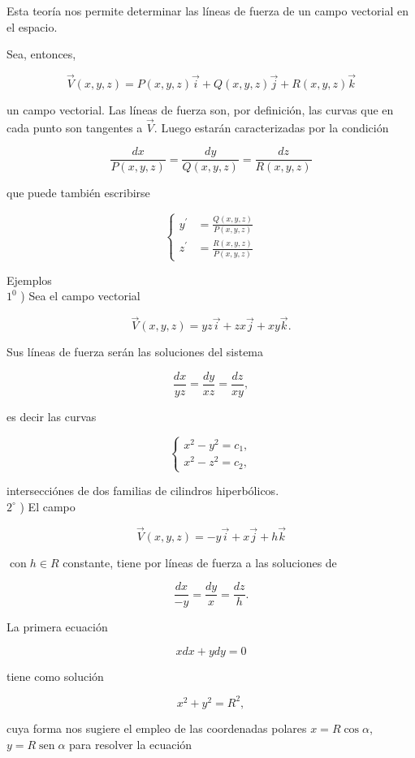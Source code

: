 \documentclass[10pt]{article}
\theoremstyle{plain}
\theoremstyle{definition}
\theoremstyle{remark}
\begin{document}
Esta teoría nos permite determinar las líneas de fuerza de un campo vectorial en el espacio.

Sea, entonces,

$$
\vec{V}(x, y, z)=P(x, y, z) \vec{i}+Q(x, y, z) \vec{j}+R(x, y, z) \vec{k}
$$

un campo vectorial. Las líneas de fuerza son, por definición, las curvas que en cada punto son tangentes a $\vec{V}$. Luego estarán caracterizadas por la condición

$$
\frac{d x}{P(x, y, z)}=\frac{d y}{Q(x, y, z)}=\frac{d z}{R(x, y, z)}
$$

que puede también escribirse

$$
\left\{\begin{aligned}
y^{\prime} & =\frac{Q(x, y, z)}{P(x, y, z)} \\
z^{\prime} & =\frac{R(x, y, z)}{P(x, y, z)}
\end{aligned}\right.
$$

Ejemplos\\
$1^{0}$ ) Sea el campo vectorial

$$
\vec{V}(x, y, z)=y z \vec{i}+z x \vec{j}+x y \vec{k} .
$$

Sus líneas de fuerza serán las soluciones del sistema

$$
\frac{d x}{y z}=\frac{d y}{x z}=\frac{d z}{x y},
$$

es decir las curvas

$$
\left\{\begin{array}{l}
x^{2}-y^{2}=c_{1}, \\
x^{2}-z^{2}=c_{2},
\end{array}\right.
$$

intersecciónes de dos familias de cilindros hiperbólicos.\\
$2^{\circ}$ ) El campo

$$
\vec{V}(x, y, z)=-y \vec{i}+x \vec{j}+h \vec{k}
$$

$\operatorname{con} h \in R$ constante, tiene por líneas de fuerza a las soluciones de

$$
\frac{d x}{-y}=\frac{d y}{x}=\frac{d z}{h} .
$$

La primera ecuación

$$
x d x+y d y=0
$$

tiene como solución

$$
x^{2}+y^{2}=R^{2},
$$

cuya forma nos sugiere el empleo de las coordenadas polares $x=R \cos \alpha$,\\
$y=R \operatorname{sen} \alpha$ para resolver la ecuación
\end{document}
